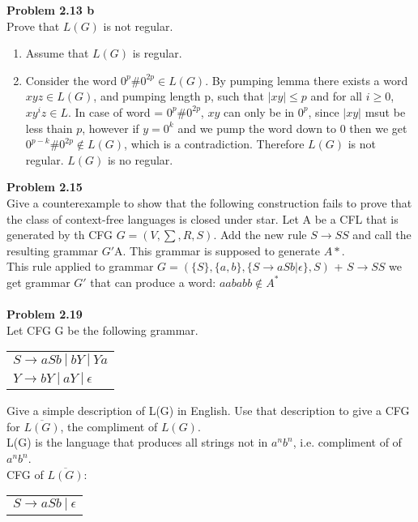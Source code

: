 \documentclass{article}
\newcommand\curl[1]{\{#1\}}
\newcommand{\problem}[1]{\large{\textbf{Problem #1} \\}}
\begin{document}
\problem{2.13 b}
Prove that $L(G)$ is not regular. \\

\begin{enumerate}[1., leftmargin = 0.5cm]
\itemsep0em
\item Assume that $L(G)$ is regular.
\item Consider the word $0^p\#0^{2p} \in L(G)$. By pumping lemma there exists a word $xyz \in L(G)$, and pumping
length p, such that $|xy| \leq p$ and for all $i \geq 0$, $xy^iz \in L$. In case of word = $0^p \# 0^{2p}$, $xy$
can only be in $0^p$, since $|xy|$ msut be less thain $p$, however if $y = 0^k$ and we pump the word down 
to 0 then we get $0^{p-k} \# 0^{2p} \notin L(G)$, which is a contradiction. Therefore $L(G)$ is not regular.
$L(G)$ is no regular.
\end{enumerate}

\problem{2.15}
Give a counterexample to show that the following construction fails to prove that the class of context-free languages is closed under star.
Let A be a CFL that is generated by th CFG $G = (V,\sum,R,S)$. Add the new rule $S \rightarrow SS$ and call the
resulting grammar $G'$A. This grammar is supposed to generate $A*$. \\

This rule applied to grammar $G = (\curl{S},\curl{a,b},\curl{S\rightarrow aSb | \epsilon},S)$ + $S\rightarrow SS$ we get grammar $G'$
that can produce a word:
$aababb \notin A^*$ \\ \\

\problem{2.19}
Let  CFG G be the following grammar.
\begin{table}[h!]
\centering
\begin{tabular}{l}
$S \rightarrow a S b\: | \:b Y \:|\: Y a $\\
$Y \rightarrow b Y \:| \:a Y \:| \:\epsilon$
\end{tabular}
\end{table}

Give a simple description of L(G) in English. Use that description to give a CFG for $\overline{L(G)}$, the compliment of $L(G)$. \\

L(G) is the language that produces all strings not in $a^nb^n$, i.e. compliment of of $a^nb^n$. \\

CFG of $\overline{L(G)}$:

\begin{table}[h!]
\centering
\begin{tabular}{l}
$S \rightarrow a S b\: | \: \epsilon$
\end{tabular}
\end{table}
\end{document}
